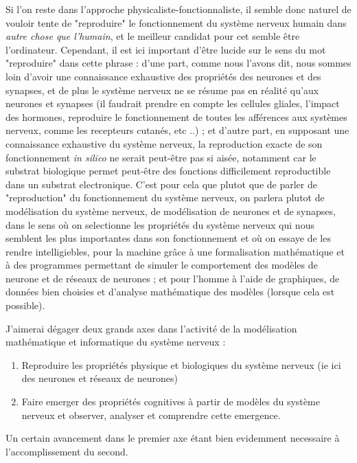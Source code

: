 \documentclass[12pt]{scrartcl}
\begin{document}
	Si l'on reste dans l'approche physicaliste-fonctionnaliste, il semble donc naturel de vouloir tente de "reproduire" le fonctionnement du système nerveux humain dans \textit{autre chose que l'humain}, et le meilleur candidat pour cet  semble être l'ordinateur. Cependant, il est ici important d'être lucide sur le sens du mot "reproduire" dans cette phrase : d'une part, comme nous l'avons dit, nous sommes loin d'avoir une connaissance exhaustive des propriétés des neurones et des synapses, et de plus le système nerveux ne se résume pas en réalité qu'aux neurones et synapses (il faudrait prendre en compte les cellules gliales, l'impact des hormones, reproduire le fonctionnement de toutes les afférences aux systèmes nerveux, comme les recepteurs cutanés, etc ..) ; et d'autre part, en supposant une connaissance exhaustive du système nerveux, la reproduction exacte de son fonctionnement \textit{in silico} ne serait peut-être pas si aisée, notamment car le substrat biologique permet peut-être des fonctions difficilement reproductible dans un substrat electronique. C'est pour cela que plutot que de parler de "reproduction" du fonctionnement du système nerveux, on parlera plutot de modélisation du système nerveux, de modélisation de neurones et de synapses, dans le sens où on selectionne les propriétés du système nerveux qui nous semblent les plus importantes dans son fonctionnement et où on essaye de les rendre intelligiebles, pour la machine grâce à une formalisation mathématique et à des programmes permettant de simuler le comportement des modèles de neurone et de réseaux de neurones ; et pour l'homme à l'aide de graphiques, de données bien choisies et d'analyse mathématique des modèles (lorsque cela est possible).
	
	J'aimerai dégager deux grands axes dans l'activité de la modélisation mathématique et informatique du système nerveux :
	\begin{enumerate} \item Reproduire les propriétés physique et biologiques du système nerveux (ie ici des neurones et réseaux de neurones) 
	\item Faire emerger des propriétés cognitives à partir de modèles du système nerveux et observer, analyser et comprendre cette emergence. \end{enumerate}

	Un certain avancement dans le premier axe étant bien evidemment necessaire à l'accomplissement du second.
	
\end{document}
